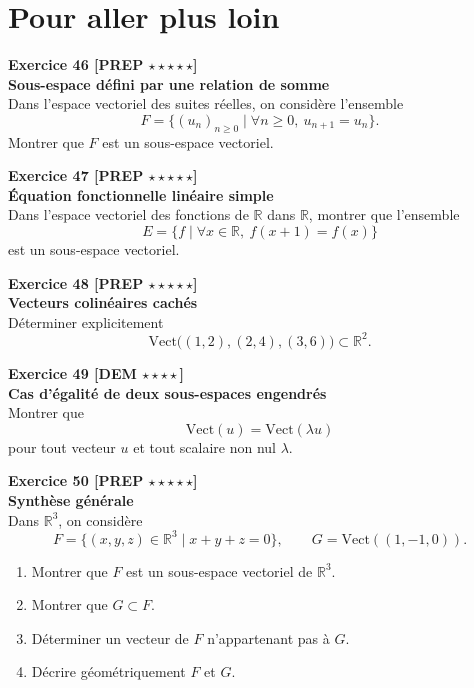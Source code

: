 \documentclass[11pt,a4paper]{article}
\begin{document}
\newpage

\section*{Pour aller plus loin}

\textbf{Exercice 46 [PREP $\star\star\star\star\star$]}\\
\textbf{Sous-espace défini par une relation de somme}\\
Dans l’espace vectoriel des suites réelles, on considère l’ensemble
\[
F=\{(u_n)_{n\ge 0}\mid \forall n\ge 0,\ u_{n+1}=u_n\}.
\]
Montrer que $F$ est un sous-espace vectoriel.

\textbf{Exercice 47 [PREP $\star\star\star\star\star$]}\\
\textbf{Équation fonctionnelle linéaire simple}\\
Dans l’espace vectoriel des fonctions de $\mathbb{R}$ dans $\mathbb{R}$, montrer que l’ensemble
\[
E=\{f\mid \forall x\in\mathbb{R},\ f(x+1)=f(x)\}
\]
est un sous-espace vectoriel.

\textbf{Exercice 48 [PREP $\star\star\star\star\star$]}\\
\textbf{Vecteurs colinéaires cachés}\\
Déterminer explicitement
\[
\mathrm{Vect}\big((1,2),(2,4),(3,6)\big)\subset\mathbb{R}^2.
\]

\textbf{Exercice 49 [DEM $\star\star\star\star$]}\\
\textbf{Cas d’égalité de deux sous-espaces engendrés}\\
Montrer que
\[
\mathrm{Vect}(u)=\mathrm{Vect}(\lambda u)
\]
pour tout vecteur $u$ et tout scalaire non nul $\lambda$.

\textbf{Exercice 50 [PREP $\star\star\star\star\star$]}\\
\textbf{Synthèse générale}\\
Dans $\mathbb{R}^3$, on considère
\[
F=\{(x,y,z)\in\mathbb{R}^3\mid x+y+z=0\},
\qquad
G=\mathrm{Vect}((1,-1,0)).
\]
\begin{enumerate}[label=\alph*)]
    \item Montrer que $F$ est un sous-espace vectoriel de $\mathbb{R}^3$.
    \item Montrer que $G\subset F$.
    \item Déterminer un vecteur de $F$ n’appartenant pas à $G$.
    \item Décrire géométriquement $F$ et $G$.
\end{enumerate}
\end{document}
